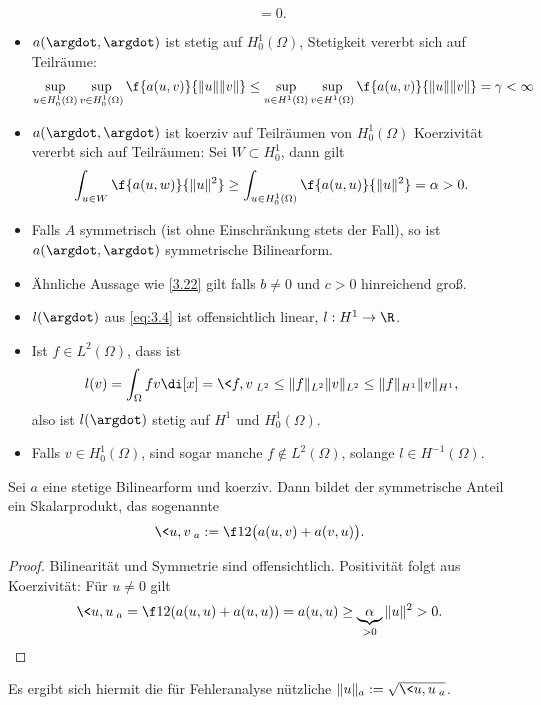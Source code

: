 \begin{st}[Stetigkeit und Koerzivität, $b=0$, $c = 0$]
\begin{note}
\begin{itemize}
\[					= 0.
				\]
			\item
				$a(\argdot, \argdot)$ ist stetig auf $H_0^1(\Omega)$, Stetigkeit vererbt sich auf Teilräume:
				\begin{align*}
					\sup_{u \in H_0^1(\Omega)} \sup_{v \in H_0^1(\Omega)} \f{a(u,v)}{\|u\|\|v\|}
					\le \sup_{u \in H^1(\Omega)} \sup_{v \in H^1(\Omega)} \f{a(u,v)}{\|u\|\|v\|}
					= \gamma < \infty
				\end{align*}
			\item
				$a(\argdot, \argdot)$ ist koerziv auf Teilräumen von $H_0^1(\Omega)$ Koerzivität vererbt sich auf Teilräumen:
				Sei $W \subset H_0^1$, dann gilt
				\[
					\int_{u \in W} \f{a(u,w)}{\|u\|^2}
					\ge \int_{u \in H_0^1(\Omega)} \f{a(u,u)}{\|u\|^2}
					= \alpha
					> 0.
				\]
			\item
				Falls $A$ symmetrisch (ist ohne Einschränkung stets der Fall), so ist $a(\argdot, \argdot)$ symmetrische Bilinearform.
			\item
				Ähnliche Aussage wie \ref{3.22} gilt falls $b \neq 0$ und $c > 0$ hinreichend groß.
		\end{itemize}
	\end{note}
\end{st}

\begin{note}
	\begin{itemize}
		\item
			$l(\argdot)$ aus \eqref{eq:3.4} ist offensichtlich linear, $l: H^1 \to \R$.
		\item
			Ist $f \in L^2(\Omega)$, dass ist
			\[
				l(v) = \int_\Omega fv \di[x]
				= \<f, v \>_{L^2}
				\le \|f\|_{L^2} \|v\|_{L^2}
				\le \|f\|_{H^1}\|v\|_{H^1},
			\]
			also ist $l(\argdot)$ stetig auf $H^1$ und $H_0^1(\Omega)$.
		\item
			Falls $v \in H_0^1(\Omega)$, sind sogar manche $f \not\in L^2(\Omega)$, solange $l \in H^{-1}(\Omega)$.
	\end{itemize}
\end{note}


\begin{df} \label{3.23}
	Sei $a$ eine stetige Bilinearform und koerziv.
	Dann bildet der symmetrische Anteil ein Skalarprodukt, das sogenannte 
	\[
		\<u,v\>_a :=  \f 12\big(a(u,v) + a(v,u)\big).
	\]
	\begin{proof}
		Bilinearität und Symmetrie sind offensichtlich.
		Positivität folgt aus Koerzivität:
		Für $u \neq 0$ gilt
		\[
			\<u,u\>_a
			= \f 12 (a(u,u) + a(u,u))
			= a(u,u)
			\ge \underbrace{\alpha}_{>0} \|u\|^2
			> 0.
		\]
	\end{proof}
	\begin{note}
		Es ergibt sich hiermit die für Fehleranalyse nützliche  $\|u\|_a := \sqrt{\<u,u\>_a}$.
	\end{note}
\end{df}

